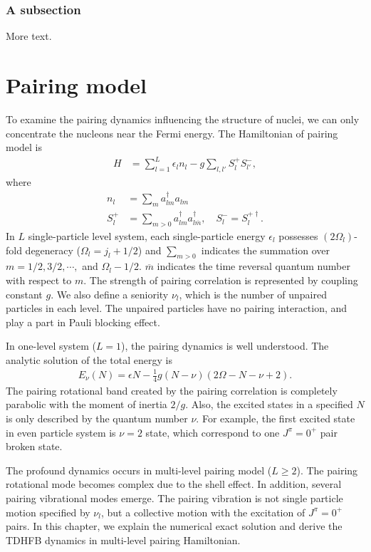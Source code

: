 \documentclass[11pt]{book} %
\begin{document}
\subsection{A subsection}

More text.

\chapter{Pairing model}

To examine the pairing dynamics influencing the structure of nuclei, we can only concentrate the nucleons near the Fermi energy. The Hamiltonian of pairing model is
\begin{align}
	H &= \sum_{l=1}^L \epsilon_l n_l - g \sum_{l,l'} S_l^+ S_{l'}^- ,
\end{align}
where
\begin{align}
	n_l &= \sum_m a^{\dag}_{lm}a_{lm} \\
        S_l^{+} &= \sum_{m>0}a_{lm}^{\dag}a_{l\overline{m}}^{\dag} ,
\quad   S_l^{-} = S_l^{+\dag} .
\label{S_+}
\end{align}
In $L$ single-particle level system, each single-particle energy $\epsilon_l$ possesses $(2\Omega_l)$-fold
degeneracy ($\Omega_l=j_l+1/2$)
and $\sum_{m>0}$ indicates the summation over $m=1/2,3/2,\cdots,$ and $\Omega_l-1/2$. $\overline{m}$ indicates the time reversal quantum number with respect to $m$. The strength of pairing correlation is represented by coupling constant $g$. We also define a seniority $\nu_l$, which is the number of unpaired particles in each level. The unpaired particles have no pairing interaction, and play a part in Pauli blocking effect.\par
In one-level system ($L=1$), the pairing dynamics is well understood. The analytic solution of the total energy is
\begin{align}
	E_{\nu}(N) = \epsilon N - \frac{1}{4}g(N-\nu)(2\Omega-N-\nu+2) .
\end{align}
The pairing rotational band created by the pairing correlation is completely parabolic with the moment of inertia $2/g$. Also, the excited states in a specified $N$ is only described by the quantum number $\nu$. For example, the first excited state in even particle system is $\nu=2$ state, which correspond to one $J^{\pi}=0^+$ pair broken state.\par
The profound dynamics occurs in multi-level pairing model ($L\ge 2$). The pairing rotational mode becomes complex due to the shell effect. In addition, several pairing vibrational modes emerge. The pairing vibration is not single particle motion specified by $\nu_l$, but a collective motion with the excitation of $J^{\pi}=0^+$ pairs. In this chapter, we explain the numerical exact solution and derive the TDHFB dynamics in multi-level pairing Hamiltonian.
\end{document}
